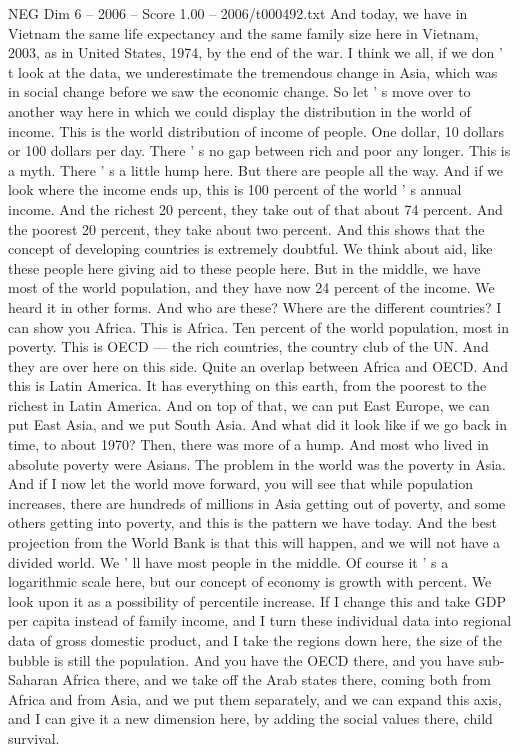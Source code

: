 \begin{textsample}{NEG Dim 6 – 2006 – Score 1.00 – 2006/t000492.txt}
And today, we have in Vietnam the same life expectancy and the same family size here in Vietnam, 2003, as in United States, 1974, by the end of the war.
I think we all, if we don ' t look at the data, we underestimate the tremendous change in Asia, which was in social change before we saw the economic change.
So let ' s move over to another way here in which we could display the distribution in the world of income.
This is the world distribution of income of people.
One dollar, 10 dollars or 100 dollars per day.
There ' s no gap between rich and poor any longer.
This is a myth.
There ' s a little hump here.
But there are people all the way.
And if we look where the income ends up, this is 100 percent of the world ' s annual income.
And the richest 20 percent, they take out of that about 74 percent.
And the poorest 20 percent, they take about two percent.
And this shows that the concept of developing countries is extremely doubtful.
We think about aid, like these people here giving aid to these people here.
But in the middle, we have most of the world population, and they have now 24 percent of the income.
We heard it in other forms.
And who are these?
Where are the different countries?
I can show you Africa.
This is Africa.
Ten percent of the world population, most in poverty.
This is OECD — the rich countries, the country club of the UN.
And they are over here on this side.
Quite an overlap between Africa and OECD.
And this is Latin America.
It has everything on this earth, from the poorest to the richest in Latin America.
And on top of that, we can put East Europe, we can put East Asia, and we put South Asia.
And what did it look like if we go back in time, to about 1970?
Then, there was more of a hump.
And most who lived in absolute poverty were Asians.
The problem in the world was the poverty in Asia.
And if I now let the world move forward, you will see that while population increases, there are hundreds of millions in Asia getting out of poverty, and some others getting into poverty, and this is the pattern we have today.
And the best projection from the World Bank is that this will happen, and we will not have a divided world.
We ' ll have most people in the middle.
Of course it ' s a logarithmic scale here, but our concept of economy is growth with percent.
We look upon it as a possibility of percentile increase.
If I change this and take GDP per capita instead of family income, and I turn these individual data into regional data of gross domestic product, and I take the regions down here, the size of the bubble is still the population.
And you have the OECD there, and you have sub-Saharan Africa there, and we take off the Arab states there, coming both from Africa and from Asia, and we put them separately, and we can expand this axis, and I can give it a new dimension here, by adding the social values there, child survival.

\end{textsample}
